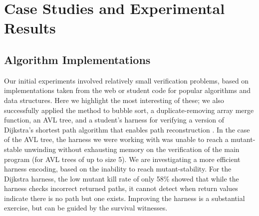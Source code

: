 \documentclass[conference]{IEEEtran}
\begin{document}

\section{Case Studies and Experimental Results}

\subsection{Algorithm Implementations}

Our initial experiments involved relatively small verification
problems, based on implementations taken from the web or student code for popular
algorithms and data structures.  Here we highlight the most
interesting of these; we also successfully applied the method to
bubble sort, a duplicate-removing array merge function, an AVL
tree, and a student's harness for verifying a version of Dijkstra's
shortest path algorithm that enables path reconstruction \cite{dijkstrasp}.  In the case of the AVL tree, the harness we were working with
was unable to reach a mutant-stable unwinding without exhausting
memory on the verification of the main program (for AVL trees of up to
size 5).  We are investigating a more efficient harness encoding,
based on the inability to reach mutant-stability.  For the Dijkstra
harness, the low mutant kill rate of only 58\% showed that while the
harness checks incorrect returned paths, it cannot detect when return
values indicate there is no path but one exists.  Improving the
harness is a substantial exercise, but can be guided by the survival witnesses.
\end{document}
